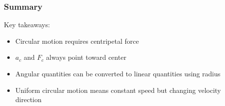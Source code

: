 \documentclass{beamer}
\begin{document}
\begin{frame}
\frametitle{Summary}
Key takeaways:
\begin{itemize}
    \item Circular motion requires centripetal force
    \item $a_c$ and $F_c$ always point toward center
    \item Angular quantities can be converted to linear quantities using radius
    \item Uniform circular motion means constant speed but changing velocity direction
\end{itemize}
\end{frame}
\end{document}
